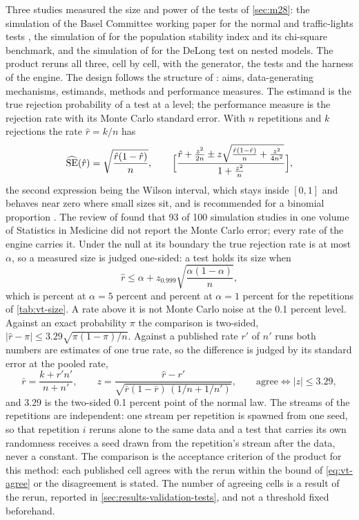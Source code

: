 Three studies measured the size and power of the tests of \cref{sec:m28}: the simulation of the Basel Committee working paper for the normal and traffic-lights tests \citep{credit-scoring:bcbswp14}, the simulation of \citet{credit-scoring:yurdakul2020}
for the population stability index and its chi-square benchmark, and the simulation of \citet{validation-tests:demler2012} for the DeLong test on nested models. The product reruns all three, cell by cell, with the generator, the tests and the harness of the engine.
The design follows the structure of \citet{alm:morris2019}: aims, data-generating mechanisms, estimands, methods and performance measures. The estimand is the true rejection probability of a test at a level; the performance measure is the rejection rate with its Monte Carlo
standard error. With $n$ repetitions and $k$ rejections the rate $\hat r=k/n$ has
\begin{equation}
  \widehat{\mathrm{SE}}(\hat r)=\sqrt{\frac{\hat r(1-\hat r)}{n}},\qquad
  \Bigl[\frac{\hat r+\frac{z^2}{2n}\pm z\sqrt{\frac{\hat r(1-\hat r)}{n}+\frac{z^2}{4n^2}}}{1+\frac{z^2}{n}}\Bigr],
  \label{eq:vt-mcse}
\end{equation}
the second expression being the Wilson interval, which stays inside $[0,1]$ and behaves near zero where small sizes sit, and is recommended for a binomial proportion \citep{ratings:brown2001}. The review of \citet{alm:morris2019} found that 93 of 100 simulation studies in one volume of Statistics in Medicine did not report
the Monte Carlo error; every rate of the engine carries it. Under the null at its boundary the true rejection rate is at most $\alpha$, so a measured size is judged one-sided: a test holds its size when
\begin{equation}
  \hat r\le\alpha+z_{0.999}\sqrt{\frac{\alpha(1-\alpha)}{n}},
  \label{eq:vt-sizebound}
\end{equation}
which is \vtBoundFive{} percent at $\alpha=5$ percent and \vtBoundOne{} percent at $\alpha=1$ percent for the repetitions of \cref{tab:vt-size}. A rate above it is not Monte Carlo noise at the 0.1 percent level. Against an exact probability $\pi$ the comparison is two-sided, $|\hat r-\pi|\le 3.29\sqrt{\pi(1-\pi)/n}$. Against
a published rate $r'$ of $n'$ runs both numbers are estimates of one true rate, so the difference is judged by its standard error at the pooled rate,
\begin{equation}
  \bar r=\frac{k+r'n'}{n+n'},\qquad z=\frac{\hat r-r'}{\sqrt{\bar r(1-\bar r)\,(1/n+1/n')}},\qquad\text{agree}\iff|z|\le 3.29,
  \label{eq:vt-agree}
\end{equation}
and 3.29 is the two-sided 0.1 percent point of the normal law. The streams of the repetitions are independent: one stream per repetition is spawned from one seed, so that repetition $i$ reruns alone to the same data and a test that carries its own randomness receives a seed drawn from the repetition's stream after the data, never a constant.
The comparison is the acceptance criterion of the product for this method: each published cell agrees with the rerun within the bound of \cref{eq:vt-agree} or the disagreement is stated. The number of agreeing cells is a result of the rerun, reported in \cref{sec:results-validation-tests}, and not a threshold fixed beforehand.

